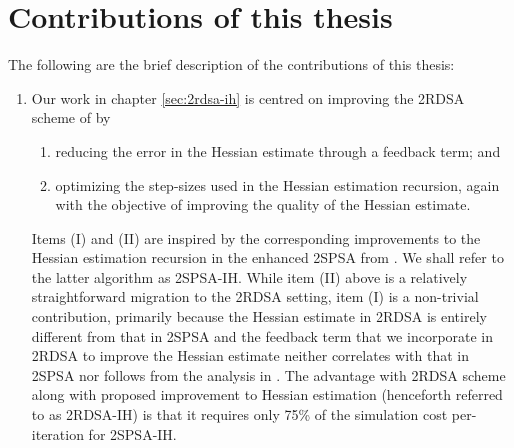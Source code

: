 \section{Contributions of this thesis}
The following are the brief description of the contributions of this thesis:
\begin{enumerate}
\item Our work in chapter \ref{sec:2rdsa-ih} is centred on improving the 2RDSA scheme of \cite{prashanth2015rdsa} by 
\begin{enumerate}[label={\bf\Roman*}]
\item reducing the error in the Hessian estimate through a feedback term; and
\item optimizing the step-sizes used in the Hessian estimation recursion, again with the objective of improving the quality of the Hessian estimate.
\end{enumerate}

Items (I) and (II) are inspired by the corresponding improvements to the Hessian estimation recursion in the enhanced 2SPSA from \cite{spall-jacobian}. We shall refer to the latter algorithm as 2SPSA-IH. While item (II) above is a relatively straightforward migration to the 2RDSA setting, item (I) is a non-trivial contribution, primarily because the Hessian estimate in 2RDSA is entirely different from that in 2SPSA and the feedback term that we incorporate in 2RDSA to improve the Hessian estimate neither correlates with that in 2SPSA nor follows from the analysis in \cite{spall-jacobian}. 
The advantage with 2RDSA scheme along with proposed improvement to Hessian estimation (henceforth referred to as 2RDSA-IH) is that it requires only 75\% of the simulation cost per-iteration for 2SPSA-IH.


\end{enumerate}
